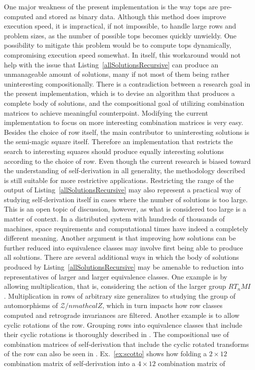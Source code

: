 One major weakness of the present implementation is the way tops are pre-computed and stored as binary data. Although this method does improve execution speed, it is impractical, if not impossible, to handle large rows and problem sizes, as the number of possible tops becomes quickly unwieldy. One possibility to mitigate this problem would be to compute tops dynamically, compromising execution speed somewhat. In itself, this workaround would not help with the issue that Listing~\ref{allSolutionsRecursive} can produce an unmanageable amount of solutions, many if not most of them being rather uninteresting compositionally. There is a contradiction between a research goal in the present implementation, which is to devise an algorithm that produces a complete body of solutions, and the compositional goal of utilizing combination matrices to achieve meaningful counterpoint. Modifying the current implementation to focus on more interesting combination matrices is very easy. Besides the choice of row itself, the main contributor to uninteresting solutions is the semi-magic square itself. Therefore an implementation that restricts the search to interesting squares should produce equally interesting solutions according to the choice of row. Even though the current research is biased toward the understanding of self-derivation in all generality, the methodology described is still suitable for more restrictive applications. Restricting the range of the output of Listing~\ref{allSolutionsRecursive} may also represent a practical way of studying self-derivation itself in cases where the number of solutions is too large. This is an open topic of discussion, however, as what is considered too large is a matter of context. In a distributed system with hundreds of thousands of machines, space requirements and computational times have indeed a completely different meaning. Another argument is that improving how solutions can be further reduced into equivalence classes may involve first being able to produce all solutions. There are several additional ways in which the body of solutions produced by Listing~\ref{allSolutionsRecursive} may be amenable to reduction into representatives of larger and larger equivalence classes. One example is by allowing multiplication, that is, considering the action of the larger group $RT_nMI$. Multiplication in rows of arbitrary size generalizes to studying the group of automorphisms of $\mathcal{Z} / n mathcal{Z}$, which in turn impacts how row classes computed and retrograde invariances are filtered. Another example is to allow cyclic rotations of the row. Grouping rows into equivalence classes that include their cyclic rotations is thoroughly described in \cite{FripertingerLackner2015}. The compositional use of combination matrices of self-derivation that include the cyclic rotated transforms of the row can also be seen in \cite{Scotto2000}. Ex.~\ref{ex:scotto} shows how folding a $2 \times 12$ combination matrix of self-derivation into a $4 \times 12$ combination matrix of 

